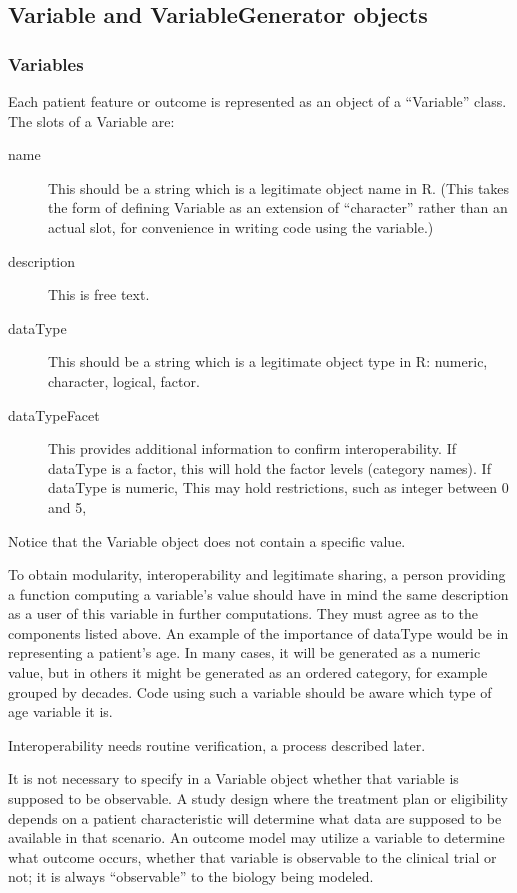 \documentclass[12pt]{amsart}
\begin{document}
\subsection{Variable and VariableGenerator objects}

\subsubsection{Variables}

Each patient feature or outcome is represented as an object of a ``Variable'' class.
The slots of a Variable are:
\begin{description}
\item[ name] This should be a string which is a legitimate object name in R. (This takes the form of defining Variable as an extension of ``character'' rather than an actual slot, for convenience in writing code using the variable.) 
\item[ description] This is free text.
\item[ dataType]  This should be a string which is a legitimate object type in R: numeric, character, logical, factor.
\item[ dataTypeFacet] This provides additional information to confirm interoperability. If dataType is
a factor, this will hold the factor levels (category names). If dataType is numeric, This may hold
restrictions, such as integer between 0 and 5, 
\end{description}

Notice that the Variable object does not contain a specific value.

To obtain modularity, interoperability and legitimate sharing, 
a person providing a function computing a variable's value
should have in mind the same description 
as a user of this variable in further computations.
They must agree as to the  components listed above.
An example of the importance of  dataType would be in representing a patient's age.
In many cases, it will be generated as a numeric value, but in others it might
be generated as an ordered category, for example grouped by decades. 
Code using such a variable should be aware which type of age variable it is.

Interoperability needs routine verification, a process described later.

It is not necessary to specify in a Variable object whether that variable 
is supposed to be observable.
A study design where the treatment plan or eligibility depends on a patient
characteristic will determine what data are supposed to be available in that scenario.
An outcome model may utilize a variable to determine what outcome occurs,
whether that variable is  observable to the clinical trial or not;
it is always ``observable'' to the biology being modeled.
\end{document}
